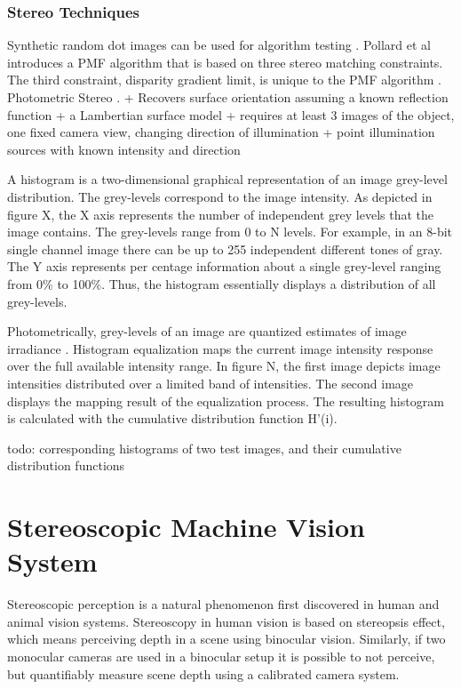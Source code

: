 \documentclass[12pt,a4paper,oneside,pdftex]{report}
\begin{document}
{\subsection{Stereo Techniques}
Synthetic random dot images can be used for algorithm testing \cite{Zitnick00}.
Pollard et al introduces a PMF algorithm that is based on three stereo matching constraints. The third constraint, disparity gradient limit, is unique to the PMF algorithm \cite{Sonka07}.
Photometric Stereo \cite{Woodham80}.
    + Recovers surface orientation assuming a known reflection function
    + a Lambertian surface model
    + requires at least 3 images of the object, one fixed camera view, changing direction of illumination
    + point illumination sources with known intensity and direction



A histogram is a two-dimensional graphical representation of an image grey-level distribution. The grey-levels correspond to the image intensity. As depicted in figure X, the X axis represents the number of independent grey levels that the image contains. The grey-levels range from 0 to N levels. For example, in an 8-bit single channel image there can be up to 255 independent different tones of gray. The Y axis represents per centage information about a single grey-level ranging from 0\% to 100\%. Thus, the histogram essentially displays a distribution of all grey-levels.

Photometrically, grey-levels of an image are quantized estimates of image irradiance \cite{Sonka07}.
Histogram equalization maps the current image intensity response over the full available intensity range. In figure N, the first image depicts image intensities distributed over a limited band of intensities. The second image displays the mapping result of the equalization process. The resulting histogram is calculated with the cumulative distribution function H'(i).

todo: corresponding histograms of two test images, and their cumulative distribution functions

\chapter{Stereoscopic Machine Vision System}
\label{chapter:stereographic_machine_vision_system}
Stereoscopic perception is a natural phenomenon first discovered in human and animal vision systems. Stereoscopy in human vision  is based on stereopsis effect, which means perceiving depth in a scene using binocular vision. Similarly, if two monocular cameras are used in a binocular setup it is possible to not perceive, but quantifiably measure scene depth using a calibrated camera system. %

}
\end{document}
